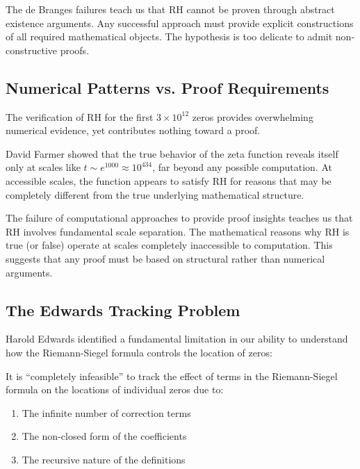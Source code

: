 \begin{lesson}
The de Branges failures teach us that RH cannot be proven through abstract existence arguments. Any successful approach must provide explicit constructions of all required mathematical objects. The hypothesis is too delicate to admit non-constructive proofs.
\end{lesson}

\subsection{Numerical Patterns vs. Proof Requirements}
\label{subsec:numerical_vs_proof}

The verification of RH for the first $3 \times 10^{12}$ zeros provides overwhelming numerical evidence, yet contributes nothing toward a proof.

\begin{example}
David Farmer showed that the true behavior of the zeta function reveals itself only at scales like $t \sim e^{1000} \approx 10^{434}$, far beyond any possible computation. At accessible scales, the function appears to satisfy RH for reasons that may be completely different from the true underlying mathematical structure.
\end{example}

\begin{lesson}
The failure of computational approaches to provide proof insights teaches us that RH involves fundamental scale separation. The mathematical reasons why RH is true (or false) operate at scales completely inaccessible to computation. This suggests that any proof must be based on structural rather than numerical arguments.
\end{lesson}

\subsection{The Edwards Tracking Problem}
\label{subsec:edwards_tracking}

Harold Edwards identified a fundamental limitation in our ability to understand how the Riemann-Siegel formula controls the location of zeros:

\begin{theorem}
It is ``completely infeasible'' to track the effect of terms in the Riemann-Siegel formula on the locations of individual zeros due to:
\begin{enumerate}
\item The infinite number of correction terms
\item The non-closed form of the coefficients
\item The recursive nature of the definitions
\end{enumerate}
\end{theorem}

